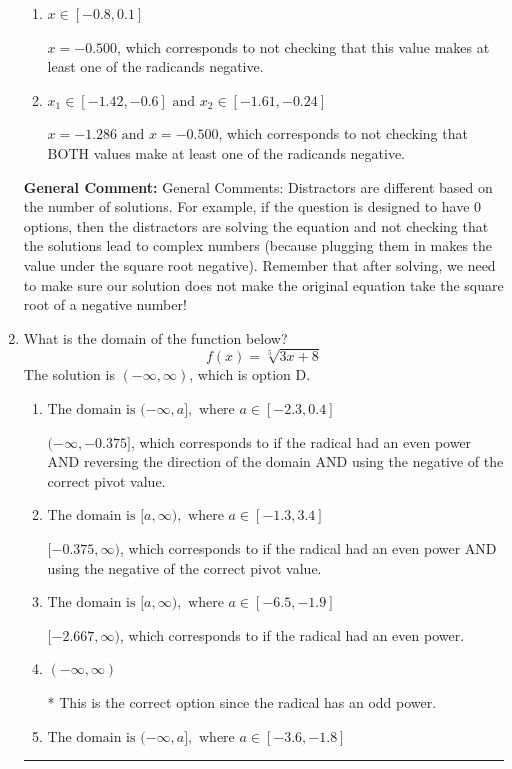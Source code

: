 \documentclass{extbook}[14pt]
\newcommand{\litem}[1]{\item #1

\rule{\textwidth}{0.4pt}}
\begin{document}
\begin{enumerate}
{\begin{enumerate}[label=\Alph*.]
$x = 1.286 \text{ and } x = 0.500$, which corresponds to getting the negatives of the values that make the equation 0.
\item \( x \in [-0.8,0.1] \)

$x = -0.500$, which corresponds to not checking that this value makes at least one of the radicands negative.
\item \( x_1 \in [-1.42, -0.6] \text{ and } x_2 \in [-1.61,-0.24] \)

$x = -1.286 \text{ and } x = -0.500$, which corresponds to not checking that BOTH values make at least one of the radicands negative.
\end{enumerate}

\textbf{General Comment:} General Comments: Distractors are different based on the number of solutions. For example, if the question is designed to have 0 options, then the distractors are solving the equation and not checking that the solutions lead to complex numbers (because plugging them in makes the value under the square root negative). Remember that after solving, we need to make sure our solution does not make the original equation take the square root of a negative number!
}
\litem{
What is the domain of the function below?
\[ f(x) = \sqrt[5]{3 x + 8} \]
The solution is \( (-\infty, \infty) \), which is option D.\begin{enumerate}[label=\Alph*.]
\item \( \text{The domain is } (-\infty, a], \text{   where } a \in [-2.3, 0.4] \)

$(-\infty, -0.375]$, which corresponds to if the radical had an even power AND reversing the direction of the domain AND using the negative of the correct pivot value.
\item \( \text{The domain is } [a, \infty), \text{   where } a \in [-1.3, 3.4] \)

$[-0.375, \infty)$, which corresponds to if the radical had an even power AND using the negative of the correct pivot value.
\item \( \text{The domain is } [a, \infty), \text{   where } a \in [-6.5, -1.9] \)

$[-2.667, \infty)$, which corresponds to if the radical had an even power.
\item \( (-\infty, \infty) \)

* This is the correct option since the radical has an odd power.
\item \( \text{The domain is } (-\infty, a], \text{   where } a \in [-3.6, -1.8] \)


\end{enumerate}}
\end{enumerate}
\end{document}
